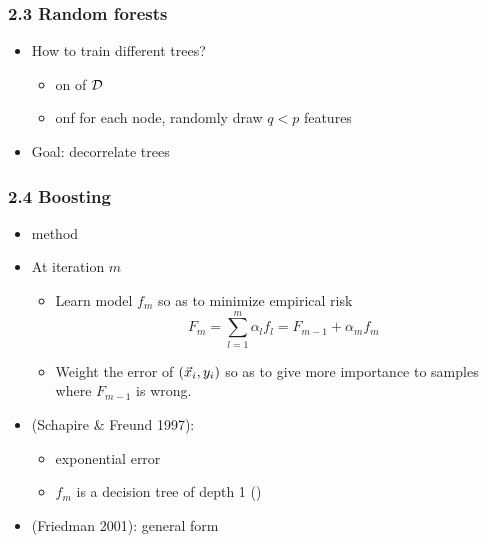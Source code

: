 \begin{frame}
  \frametitle{2.3 Random forests}
  \begin{itemize}
  \item How to train different trees?
    \begin{itemize}
    \item on   of $\mathcal{D}$ 
    \item onf  for each node, randomly draw $q < p$ features
    \end{itemize}
    \item Goal: decorrelate trees
  \end{itemize}

\end{frame}

\begin{frame}
  \frametitle{2.4 Boosting}
  \begin{itemize}
  \item {} method
  \item At iteration $m$
    \begin{itemize}
    \item Learn model $f_m$ so as to minimize empirical risk 
      \[
        F_m = \sum_{l=1}^m \alpha_l f_l = F_{m-1} + \alpha_m f_m 
      \]
    \item Weight the error of $(\vec{x}_i, y_i)$ so as to give more importance to samples where $F_{m-1}$ is wrong.
    \end{itemize}
  \item {} (Schapire \& Freund 1997):
    \begin{itemize}
    \item exponential error 
    \item $f_m$ is a decision tree of depth 1 ()
  \end{itemize}
  \item {} (Friedman 2001): general form 
  \end{itemize}
\end{frame}



